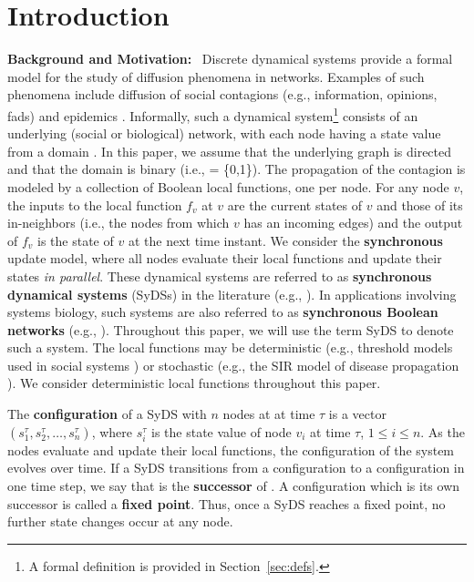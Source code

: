 \section{Introduction}
\label{sec:intro}



\smallskip

\textbf{Background and Motivation:}~
Discrete dynamical systems provide a formal model
for the study of diffusion phenomena in networks.
Examples of such phenomena include diffusion of social contagions
(e.g., information, opinions, fads) and epidemics
\cite{Adiga-etal-2019,Chistikov-etal-2020,OU-2020,MR-2007}.
Informally, such a dynamical system\footnote{A formal definition
is provided in Section~\ref{sec:defs}.}
consists of an underlying (social or biological) network, with each node having a
state value from a domain \bbb.
In this paper, we assume that the underlying
graph is directed and that the domain is binary (i.e., \bbb{} = \{0,1\}).
The propagation of the contagion is modeled by a collection
of Boolean local functions, one per node.
For any node $v$, the inputs to the local function $f_v$ at $v$
are the current states of $v$ and those of its in-neighbors (i.e., the nodes
from which $v$ has an incoming edges) and the output of $f_v$
is the state of $v$ at the next time instant.
We consider the \textbf{synchronous} update model, where all
nodes evaluate their local functions and update their states
\emph{in parallel}.
These dynamical systems are referred to
as \textbf{synchronous dynamical systems} (SyDSs) in
the literature (e.g., \cite{Adiga-etal-2019,Rosenkrantz-etal-2018}).
In applications involving systems biology, such systems are also
referred to as \textbf{synchronous Boolean networks}
(e.g., \cite{Kauffman-etal-2003,OU-2020,Akutsu-etal-2007}).
Throughout this paper, we will use the term SyDS to denote such a system.
The local functions may be deterministic (e.g., threshold models
used in social systems \cite{granovetter-1978}) or stochastic
(e.g., the SIR model of disease propagation \cite{Easley-Kleinberg-2010}).
We consider deterministic local functions throughout this paper.

The \textbf{configuration} of a SyDS with $n$ nodes at at time $\tau$ is a
vector $(s_1^{\tau}, s_2^{\tau}, \ldots, s_n^{\tau})$, where $s_i^{\tau}$
is the state value of node $v_i$ at time $\tau$, $1 \leq i \leq n$.
As the nodes evaluate and update their local functions, the configuration
of the system evolves over time.
If a SyDS transitions from a configuration \calc{} to a configuration \calcp{}
in one time step, we say that \calcp{} is the \textbf{successor} of \calc. 
A configuration \calc{} which is its own successor is called a
\textbf{fixed point}.
Thus, once a SyDS reaches a fixed point, no further state changes
occur at any node.

